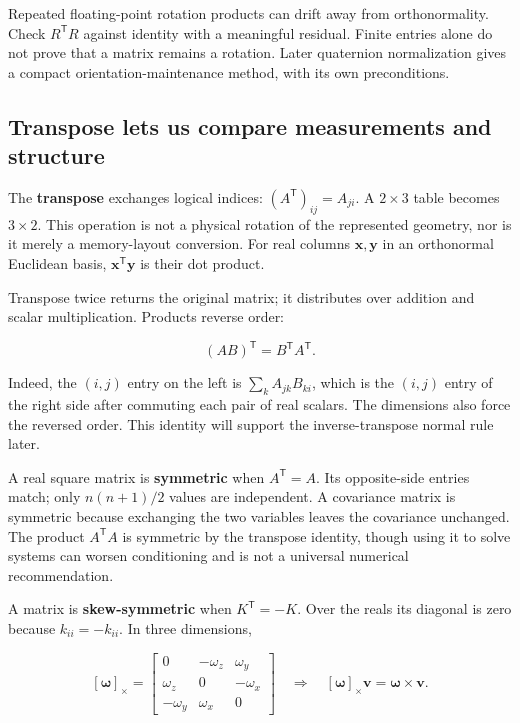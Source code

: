 Repeated floating-point rotation products can drift away from orthonormality. Check \(R^{\mathsf T}R\) against identity with a meaningful residual. Finite entries alone do not prove that a matrix remains a rotation. Later quaternion normalization gives a compact orientation-maintenance method, with its own preconditions.

\subsection{Transpose lets us compare measurements and structure}\label{01-foundations-i-ch018-transpose-lets-us-compare-measurements-and-structure}

\hypertarget{01-foundations-i-ch018-transpose-lets-us-compare-measurements-and-structure}{}

The \textbf{transpose} exchanges logical indices: \((A^{\mathsf T})_{ij}=A_{ji}\). A \(2\times3\) table becomes \(3\times2\). This operation is not a physical rotation of the represented geometry, nor is it merely a memory-layout conversion. For real columns \(\mathbf x,\mathbf y\) in an orthonormal Euclidean basis, \(\mathbf x^{\mathsf T}\mathbf y\) is their dot product.

Transpose twice returns the original matrix; it distributes over addition and scalar multiplication. Products reverse order:

\[
(AB)^{\mathsf T}=B^{\mathsf T}A^{\mathsf T}.
\]

Indeed, the \((i,j)\) entry on the left is \(\sum_kA_{jk}B_{ki}\), which is the \((i,j)\) entry of the right side after commuting each pair of real scalars. The dimensions also force the reversed order. This identity will support the inverse-transpose normal rule later.

A real square matrix is \textbf{symmetric} when \(A^{\mathsf T}=A\). Its opposite-side entries match; only \(n(n+1)/2\) values are independent. A covariance matrix is symmetric because exchanging the two variables leaves the covariance unchanged. The product \(A^{\mathsf T}A\) is symmetric by the transpose identity, though using it to solve systems can worsen conditioning and is not a universal numerical recommendation.

A matrix is \textbf{skew-symmetric} when \(K^{\mathsf T}=-K\). Over the reals its diagonal is zero because \(k_{ii}=-k_{ii}\). In three dimensions,

\[
[\boldsymbol\omega]_\times=
\begin{bmatrix}0&-\omega_z&\omega_y\\\omega_z&0&-\omega_x\\-\omega_y&\omega_x&0\end{bmatrix}
\quad\Longrightarrow\quad
[\boldsymbol\omega]_\times\mathbf v=\boldsymbol\omega\times\mathbf v.
\]

